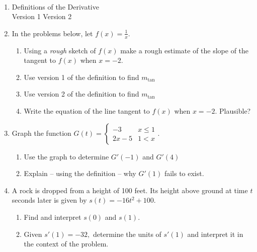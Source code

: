 \documentclass[11pt,fleqn]{article}
\begin{document}
\renewcommand{\headrulewidth}{0pt}
\newcommand{\blank}[1]{\rule{#1}{0.75pt}}
\newcommand{\bc}{\begin{center}}
\newcommand{\ec}{\end{center}}
\renewcommand{\d}{\displaystyle}

\vspace*{-0.7in}

\begin{center}
  \large
  \\
\end{center}
\begin{enumerate}
\item Definitions of the Derivative \\
Version 1 \hspace{3in}Version 2\\

\vspace{0.7in}

\item In the problems below, let $f(x)=\frac{1}{x}.$
\begin{enumerate}
	\item Using a \emph{rough} sketch of $f(x)$ make a rough estimate of the slope of the tangent to $f(x)$ when $x=-2.$
	\vfill
	\item Use version 1 of the definition to find $m_{\text{tan}}$
	\vspace{2in}
	\item Use version 2 of the definition to find $m_{\text{tan}}$
	\vspace{2in}
	\item Write the equation of the line tangent to $f(x)$ when $x=-2$. Plausible?
	\vspace{.5in}
\end{enumerate}
\newpage
\item Graph the function $G(t) =\begin{cases} -3 & x \leq 1 \\ 2x-5 & 1 < x\end{cases}.$
\begin{enumerate}
	\item Use the graph to determine $G'(-1)$ and $G'(4)$
	\vfill
	\item Explain -- using the definition -- why $G'(1)$ fails to exist.
	\vfill
\end{enumerate}
\item A rock is dropped from a height of 100 feet. Its height above ground at time $t$ seconds later is given by $s(t)= -16t^2+100.$ 
	\begin{enumerate}
	\item Find and interpret $s(0)$ and $s(1).$
	\vfill
	\item Given $s'(1)=-32,$ determine the units of $s'(1)$ and interpret it in the context of the problem.
	\vfill
	\end{enumerate}
\end{enumerate}
\end{document}

